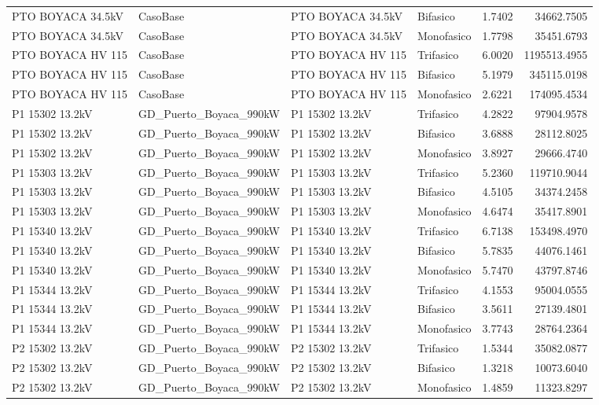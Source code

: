 \documentclass[11pt,a4paper]{article}
\begin{document}
\begin{longtable}{llllrr}
PTO BOYACA 34.5kV & CasoBase & PTO BOYACA 34.5kV & Bifasico & 1.7402 & 34662.7505 \\
PTO BOYACA 34.5kV & CasoBase & PTO BOYACA 34.5kV & Monofasico & 1.7798 & 35451.6793 \\
PTO BOYACA HV 115 & CasoBase & PTO BOYACA HV 115 & Trifasico & 6.0020 & 1195513.4955 \\
PTO BOYACA HV 115 & CasoBase & PTO BOYACA HV 115 & Bifasico & 5.1979 & 345115.0198 \\
PTO BOYACA HV 115 & CasoBase & PTO BOYACA HV 115 & Monofasico & 2.6221 & 174095.4534 \\
P1 15302 13.2kV & GD\_Puerto\_Boyaca\_990kW & P1 15302 13.2kV & Trifasico & 4.2822 & 97904.9578 \\
P1 15302 13.2kV & GD\_Puerto\_Boyaca\_990kW & P1 15302 13.2kV & Bifasico & 3.6888 & 28112.8025 \\
P1 15302 13.2kV & GD\_Puerto\_Boyaca\_990kW & P1 15302 13.2kV & Monofasico & 3.8927 & 29666.4740 \\
P1 15303 13.2kV & GD\_Puerto\_Boyaca\_990kW & P1 15303 13.2kV & Trifasico & 5.2360 & 119710.9044 \\
P1 15303 13.2kV & GD\_Puerto\_Boyaca\_990kW & P1 15303 13.2kV & Bifasico & 4.5105 & 34374.2458 \\
P1 15303 13.2kV & GD\_Puerto\_Boyaca\_990kW & P1 15303 13.2kV & Monofasico & 4.6474 & 35417.8901 \\
P1 15340 13.2kV & GD\_Puerto\_Boyaca\_990kW & P1 15340 13.2kV & Trifasico & 6.7138 & 153498.4970 \\
P1 15340 13.2kV & GD\_Puerto\_Boyaca\_990kW & P1 15340 13.2kV & Bifasico & 5.7835 & 44076.1461 \\
P1 15340 13.2kV & GD\_Puerto\_Boyaca\_990kW & P1 15340 13.2kV & Monofasico & 5.7470 & 43797.8746 \\
P1 15344 13.2kV & GD\_Puerto\_Boyaca\_990kW & P1 15344 13.2kV & Trifasico & 4.1553 & 95004.0555 \\
P1 15344 13.2kV & GD\_Puerto\_Boyaca\_990kW & P1 15344 13.2kV & Bifasico & 3.5611 & 27139.4801 \\
P1 15344 13.2kV & GD\_Puerto\_Boyaca\_990kW & P1 15344 13.2kV & Monofasico & 3.7743 & 28764.2364 \\
P2 15302 13.2kV & GD\_Puerto\_Boyaca\_990kW & P2 15302 13.2kV & Trifasico & 1.5344 & 35082.0877 \\
P2 15302 13.2kV & GD\_Puerto\_Boyaca\_990kW & P2 15302 13.2kV & Bifasico & 1.3218 & 10073.6040 \\
P2 15302 13.2kV & GD\_Puerto\_Boyaca\_990kW & P2 15302 13.2kV & Monofasico & 1.4859 & 11323.8297 \\

\end{longtable}
\end{document}

